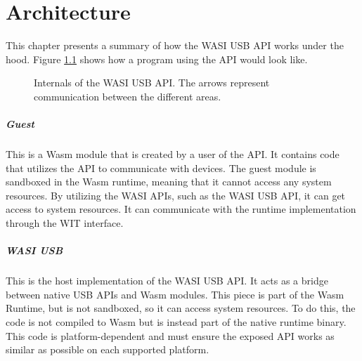 \chapter{Architecture}

This chapter presents a summary of how the \acrshort{WASI} \acrshort{USB} \acrshort{API} works under the hood.
Figure \ref{image:api_areas} shows how a program using the API would look like.

\begin{figure}[!h]
\centering
{}
\caption{Internals of the WASI USB API. The arrows represent communication between the different areas.}
\label{image:api_areas}
\end{figure}

\paragraph{Guest} This is a Wasm module that is created by a user of the API. It contains code that utilizes the API to communicate with devices. The guest module is sandboxed in the Wasm runtime, meaning that it cannot access any system resources. By utilizing the WASI APIs, such as the WASI USB API, it can get access to system resources. It can communicate with the runtime implementation through the \acrshort{WIT} interface.

\paragraph{WASI USB} This is the host implementation of the WASI USB API. It acts as a bridge between native USB APIs and Wasm modules. This piece is part of the Wasm Runtime, but is not sandboxed, so it can access system resources. To do this, the code is not compiled to Wasm but is instead part of the native runtime binary. This code is platform-dependent and must ensure the exposed API works as similar as possible on each supported platform.

